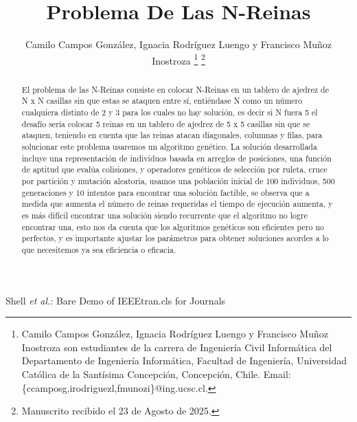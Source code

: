 \documentclass[journal]{IEEEtran}
\begin{document}
\title{Problema De Las N-Reinas}
\author{	Camilo Campos González, 
        	Ignacia Rodríguez Luengo
        	y Francisco Muñoz Inostroza
\thanks{Camilo Campos González, 
        	Ignacia Rodríguez Luengo
        	y Francisco Muñoz Inostroza son estudiantes de la carrera de Ingeniería Civil Informática del Departamento de Ingeniería Informática, Facultad de Ingeniería, Universidad Católica de la Santísima Concepción, Concepción, Chile. Email: \{ccamposg,irodriguezl,fmunozi\}@ing.ucsc.cl.}
\thanks{Manuscrito recibido el 23 de Agosto de 2025.}}

{Shell \MakeLowercase{\textit{et al.}}: Bare Demo of IEEEtran.cls for Journals}

\maketitle

\begin{abstract} \label{sec:resumen}
El problema de las N-Reinas consiste en colocar N-Reinas en un tablero de ajedrez de N x N casillas sin que estas se ataquen entre sí, entiéndase N como un número cualquiera distinto de 2 y 3 para los cuales no hay solución, es decir si N fuera 5 el desafío sería colocar 5 reinas en un tablero de ajedrez de 5 x 5 casillas sin que se ataquen, teniendo en cuenta que las reinas atacan diagonales, columnas y filas, para solucionar este problema usaremos un algoritmo genético. La solución desarrollada incluye una representación de individuos basada en arreglos de posiciones, una función de aptitud que evalúa colisiones, y operadores genéticos de selección por ruleta, cruce por partición y mutación aleatoria, usamos una población inicial de 100 individuos, 500 generaciones y 10 intentos para encontrar una solución factible, se observa que a medida que aumenta el número de reinas requeridas el tiempo de ejecución aumenta, y es más difícil encontrar una solución siendo recurrente que el algoritmo no logre encontrar una, esto nos da cuenta que los algoritmos genéticos son eficientes pero no perfectos, y es importante ajustar los parámetros para obtener soluciones acordes a lo que necesitemos ya sea eficiencia o eficacia.
\end{abstract}
\end{document}
